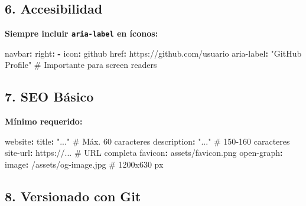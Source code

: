 \documentclass[
  doc,
  floatsintext,
  longtable,
  a4paper,
  nolmodern,
  notxfonts,
  notimes,
  12pt,
  colorlinks=true,linkcolor=blue,citecolor=blue,urlcolor=blue]{apa7}
\newenvironment{Shaded}{\begin{snugshade}}{\end{snugshade}}
\newcommand{\AttributeTok}[1]{\textcolor[rgb]{0.40,0.45,0.13}{#1}}
\newcommand{\CommentTok}[1]{\textcolor[rgb]{0.37,0.37,0.37}{#1}}
\newcommand{\FunctionTok}[1]{\textcolor[rgb]{0.28,0.35,0.67}{#1}}
\newcommand{\KeywordTok}[1]{\textcolor[rgb]{0.00,0.23,0.31}{\textbf{#1}}}
\newcommand{\StringTok}[1]{\textcolor[rgb]{0.13,0.47,0.30}{#1}}
\begin{document}
\subsection{6. Accesibilidad}\label{accesibilidad}

\textbf{Siempre incluir \texttt{aria-label} en íconos:}

\begin{Shaded}
\begin{Highlighting}[]
\FunctionTok{navbar}\KeywordTok{:}
\AttributeTok{  }\FunctionTok{right}\KeywordTok{:}
\AttributeTok{    }\KeywordTok{{-}}\AttributeTok{ }\FunctionTok{icon}\KeywordTok{:}\AttributeTok{ github}
\AttributeTok{      }\FunctionTok{href}\KeywordTok{:}\AttributeTok{ https://github.com/usuario}
\AttributeTok{      }\FunctionTok{aria{-}label}\KeywordTok{:}\AttributeTok{ }\StringTok{"GitHub Profile"}\CommentTok{    \# Importante para screen readers}
\end{Highlighting}
\end{Shaded}

\subsection{7. SEO Básico}\label{seo-buxe1sico}

\textbf{Mínimo requerido:}

\begin{Shaded}
\begin{Highlighting}[]
\FunctionTok{website}\KeywordTok{:}
\AttributeTok{  }\FunctionTok{title}\KeywordTok{:}\AttributeTok{ }\StringTok{"..."}\CommentTok{                   \# Máx. 60 caracteres}
\AttributeTok{  }\FunctionTok{description}\KeywordTok{:}\AttributeTok{ }\StringTok{"..."}\CommentTok{             \# 150{-}160 caracteres}
\AttributeTok{  }\FunctionTok{site{-}url}\KeywordTok{:}\AttributeTok{ https://...}\CommentTok{          \# URL completa}
\AttributeTok{  }\FunctionTok{favicon}\KeywordTok{:}\AttributeTok{ assets/favicon.png}
\AttributeTok{  }
\AttributeTok{  }\FunctionTok{open{-}graph}\KeywordTok{:}
\AttributeTok{    }\FunctionTok{image}\KeywordTok{:}\AttributeTok{ /assets/og{-}image.jpg}\CommentTok{  \# 1200x630 px}
\end{Highlighting}
\end{Shaded}

\subsection{8. Versionado con Git}\label{versionado-con-git}
\end{document}
